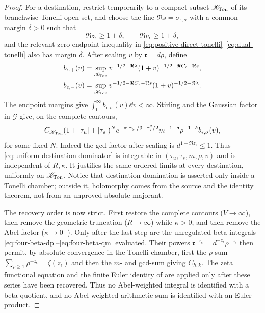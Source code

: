 \begin{proof}
For a destination, restrict temporarily to a compact subset
$\mathscr K_{\rm Ton}$ of its branchwise Tonelli open set, and choose the
line $\Re s=\sigma_{\epsilon,\sigma}$ with a common margin $\delta>0$ such
that
\begin{equation}\label{eq:tonelli-compact-margin}
 \Re z_\epsilon\geq1+\delta,\qquad
 \Re\nu_\epsilon\geq1+\delta,
\end{equation}
and the relevant zero-endpoint inequality in
\eqref{eq:positive-direct-tonelli}--\eqref{eq:dual-tonelli} also has margin
$\delta$.  After scaling $v$ by $\mathfrak r=d\rho$, define
\begin{align*}
 b_{\epsilon,+}(v)&=
 \sup_{\mathscr K_{\rm Ton}}
 v^{-1/2-\Re\lambda}
 (1+v)^{-1/2-\Re C_\epsilon-\Re s},\\
 b_{\epsilon,-}(v)&=
 \sup_{\mathscr K_{\rm Ton}}
 v^{-1/2-\Re C_\epsilon-\Re s}
 (1+v)^{-1/2-\Re\lambda}.
\end{align*}
The endpoint margins give
$\int_0^\infty b_{\epsilon,\sigma}(v)\dd v<\infty$.  Stirling and the
Gaussian factor in $\mathcal G$ give, on the complete contours,
\begin{equation}\label{eq:uniform-destination-dominator}
 C_{\mathscr K_{\rm Ton}}
 (1+|\tau_u|+|\tau_s|)^N
 e^{-\pi|\tau_u|/3-\tau_s^2/2}
 m^{-1-\delta}\rho^{-1-\delta}
 b_{\epsilon,\sigma}(v),
\end{equation}
for some fixed $N$.  Indeed the gcd factor after scaling is
$d^{1-\Re z_\epsilon}\leq1$.  Thus
\eqref{eq:uniform-destination-dominator} is integrable in
$(\tau_u,\tau_s,m,\rho,v)$ and is independent of $R,\kappa$.  It justifies
the same ordered limits at every destination, uniformly on
$\mathscr K_{\rm Ton}$.  Notice that destination domination is asserted only
inside a Tonelli chamber; outside it, holomorphy comes from the source and
the identity theorem, not from an unproved absolute majorant.

The recovery order is now strict.  First restore the complete contours
($V\to\infty$), then remove the geometric truncation ($R\to\infty$) while
$\kappa>0$, and then remove the Abel factor ($\kappa\to0^+$).  Only after the
last step are the unregulated beta integrals
\eqref{eq:four-beta-dp}--\eqref{eq:four-beta-qm} evaluated.  Their powers
$\mathfrak r^{-z_\epsilon}=d^{-z_\epsilon}\rho^{-z_\epsilon}$ then permit,
by absolute convergence in the Tonelli chamber, first the $\rho$-sum
$\sum_{\rho\geq1}\rho^{-z_\epsilon}=\zeta(z_\epsilon)$ and then the
$m$- and gcd-sum giving $C_{h,k}$.  The zeta functional equation and the
finite Euler identity of  are applied only after these
series have been recovered.  Thus no Abel-weighted integral is identified
with a beta quotient, and no Abel-weighted arithmetic sum is identified with
an Euler product.


\end{proof}
